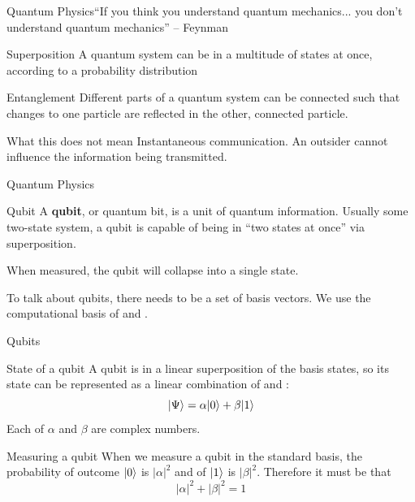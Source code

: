 \documentclass[12pt]{beamer}
\begin{document}
\begin{frame}{Quantum Physics}{``If you think you understand quantum mechanics...
	you don't understand quantum mechanics'' -- Feynman}

	\begin{block}{Superposition}
		A quantum system can be in a multitude of states at once, according to a
		probability distribution
	\end{block}

	\begin{block}{Entanglement}
		Different parts of a quantum system can be connected such that changes
		to one particle are reflected in the other, connected particle.
	\end{block}

	\begin{alertblock}{What this does not mean}
		Instantaneous communication. An outsider cannot influence the
		information being transmitted.
	\end{alertblock}
\end{frame}

\begin{frame}{Quantum Physics}
	\begin{block}{Qubit}
		A \textbf{qubit}, or quantum bit, is a unit of quantum information.
		Usually some two-state system, a qubit is capable of being in ``two
		states at once'' via superposition.

		When measured, the qubit will collapse into a single state.
	\end{block}

	To talk about qubits, there needs to be a set of basis vectors. We use the
	computational basis of  and .
\end{frame}

\begin{frame}{Qubits}
	\begin{block}{State of a qubit}
		A qubit is in a linear superposition of the basis states, so its state
		can be represented as a linear combination of  and :
		\[ |\Psi\rangle = \alpha|0\rangle + \beta|1\rangle \]
		Each of $\alpha$ and $\beta$ are complex numbers.
	\end{block}
	
	\begin{block}{Measuring a qubit}
		When we measure a qubit in the standard basis, the probability of
		outcome $|0\rangle$ is $|\alpha|^2$ and of $|1\rangle$ is $|\beta|^2$. Therefore
		it must be that
		\[ |\alpha|^2 + |\beta|^2 = 1 \]
	\end{block}
\end{frame}
\end{document}
